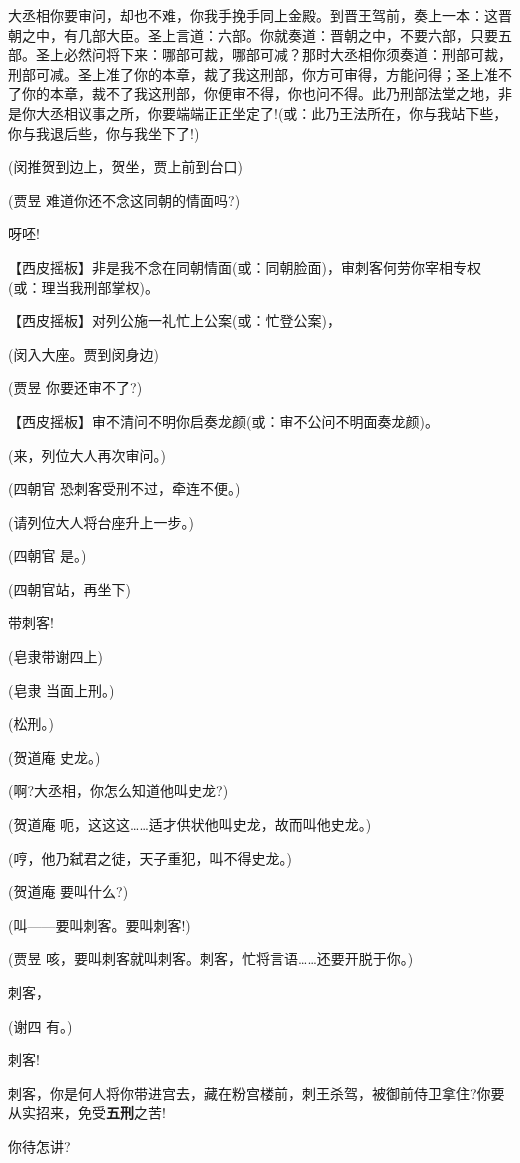 大丞相你要审问，却也不难，你我手挽手同上金殿。到晋王驾前，奏上一本：这晋朝之中，有几部大臣。圣上言道：六部。你就奏道：晋朝之中，不要六部，只要五部。圣上必然问将下来：哪部可裁，哪部可减？那时大丞相你须奏道：刑部可裁，刑部可减。圣上准了你的本章，裁了我这刑部，你方可审得，方能问得；圣上准不了你的本章，裁不了我这刑部，你便审不得，你也问不得。此乃刑部法堂之地，非是你大丞相议事之所，你要端端正正坐定了!(或：此乃王法所在，你与我站下些，你与我退后些，你与我坐下了!)

(闵推贺到边上，贺坐，贾上前到台口)

(贾昱 难道你还不念这同朝的情面吗?)

呀呸!

【西皮摇板】非是我不念在同朝情面(或：同朝脸面)，审刺客何劳你宰相专权(或：理当我刑部掌权)。

【西皮摇板】对列公施一礼忙上公案(或：忙登公案)，

(闵入大座。贾到闵身边)

(贾昱 你要还审不了?)

【西皮摇板】审不清问不明你启奏龙颜(或：审不公问不明面奏龙颜)。

(来，列位大人再次审问。)

(四朝官 恐刺客受刑不过，牵连不便。)

(请列位大人将台座升上一步。)

(四朝官 是。)

(四朝官站，再坐下)

带刺客!

(皂隶带谢四上)

(皂隶 当面上刑。)

(松刑。)

(贺道庵 史龙。)

(啊?大丞相，你怎么知道他叫史龙?)

(贺道庵 呃，这这这\ldots{}\ldots{}适才供状他叫史龙，故而叫他史龙。)

(哼，他乃弑君之徒，天子重犯，叫不得史龙。)

(贺道庵 要叫什么?)

(叫------要叫刺客。要叫刺客!)

(贾昱
咳，要叫刺客就叫刺客。刺客，忙将言语\ldots{}\ldots{}还要开脱于你。)

刺客，

(谢四 有。)

刺客!

刺客，你是何人将你带进宫去，藏在粉宫楼前，刺王杀驾，被御前侍卫拿住?你要从实招来，免受\textbf{五刑}之苦!

你待怎讲?

